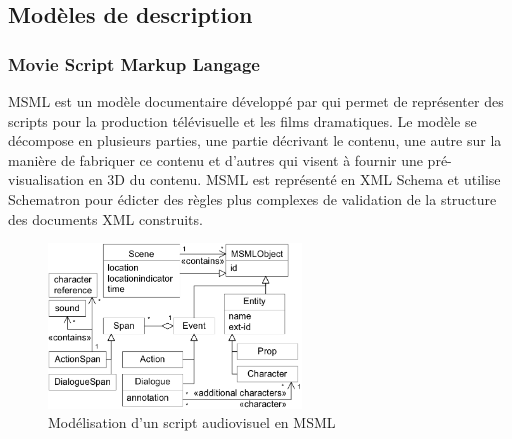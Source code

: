 \subsection{Modèles de description }\label{sec:insitu}



\subsubsection{Movie Script Markup Langage}\label{sec:msml}
MSML est un modèle documentaire développé par \cite{VanRijsselbergen2009} qui permet de représenter des scripts pour la production télévisuelle et les films dramatiques. 
Le modèle se décompose en plusieurs parties, une partie décrivant le contenu, une autre sur la manière de fabriquer ce contenu et d'autres qui visent à fournir une pré-visualisation en 3D du contenu.
MSML est représenté en XML Schema et utilise Schematron  pour édicter des règles plus complexes de validation de la structure des documents XML construits.

\begin{figure}[ht!]
\centering
\includegraphics[width=0.6\textwidth]{images/MSML-sceneModel.png}
\caption{Modélisation d'un script audiovisuel en MSML}
\label{img:msml-model}
\end{figure}

